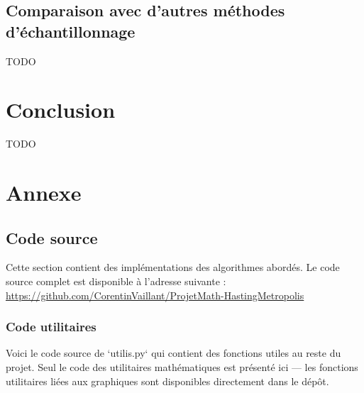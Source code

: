 \documentclass{article}
\begin{document}

\subsection{Comparaison avec d'autres méthodes d'échantillonnage}

TODO \\

\newpage
\section{Conclusion}

TODO \\

\newpage
\section{Annexe}

\subsection{Code source}

Cette section contient des implémentations des algorithmes abordés. Le code source complet est disponible à l’adresse suivante : \url{https://github.com/CorentinVaillant/ProjetMath-HastingMetropolis}

\subsubsection{Code utilitaires}

Voici le code source de `utilis.py` qui contient des fonctions utiles au reste du projet. Seul le code des utilitaires mathématiques est présenté ici — les fonctions utilitaires liées aux graphiques sont disponibles directement dans le dépôt.
\end{document}
